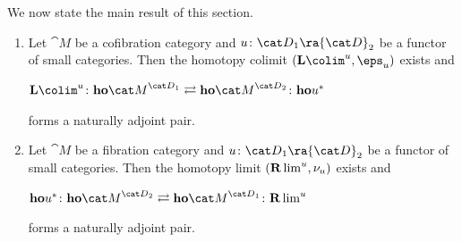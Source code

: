 We now state the main result of this section. 
\begin{thm}
\label{thm:genholim}
\mbox{}
\begin{enumerate}
\item
Let ${\cat M}$ be a cofibration category and $u \colon {\cat D}_1 \ra {\cat D}_2$ be a functor of small categories. Then the homotopy colimit $({\bf L}\colim^u, \eps_u)$ exists and 
\begin{center}
${\bf L}\colim^u \colon {\bf ho} {\cat M}^{{\cat D}_1} \rightleftarrows {\bf ho} {\cat M}^{{\cat D}_2} \colon {\bf ho}u^{*}$ 
\end{center}
forms a naturally adjoint pair.
\item
Let ${\cat M}$ be a fibration category and $u \colon {\cat D}_1 \ra {\cat D}_2$ be a functor of small categories. Then the homotopy limit $({\bf R}\lim^u, \nu_u)$ exists and 
\begin{center}
${\bf ho}u^{*} \colon {\bf ho} {\cat M}^{{\cat D}_2} \rightleftarrows {\bf ho} {\cat M}^{{\cat D}_1} \colon {\bf R}\lim^u$ 
\end{center}
forms a naturally adjoint pair.
\end{enumerate}
\end{thm}

